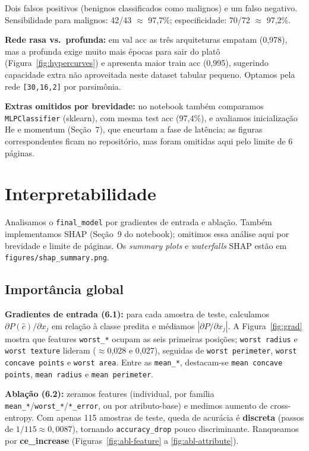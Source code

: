 \documentclass[a4paper,11pt]{article}
\begin{document}
Dois falsos positivos (benignos classificados como malignos) e um falso negativo. Sensibilidade para malignos: 42/43 $\approx$ 97,7\%; especificidade: 70/72 $\approx$ 97,2\%.

\textbf{Rede rasa vs.\ profunda:} em val acc as três arquiteturas empatam (0{,}978), mas a profunda exige muito mais épocas para sair do platô (Figura~\ref{fig:hypercurves}) e apresenta maior train acc (0{,}995), sugerindo capacidade extra não aproveitada neste dataset tabular pequeno. Optamos pela rede \texttt{[30,16,2]} por parsimônia.

\textbf{Extras omitidos por brevidade:} no notebook também comparamos \texttt{MLPClassifier} (sklearn), com mesma test acc (97,4\%), e avaliamos inicialização He e momentum (Seção~7), que encurtam a fase de latência; as figuras correspondentes ficam no repositório, mas foram omitidas aqui pelo limite de 6 páginas.

\section{Interpretabilidade}

Analisamos o \texttt{final\_model} por gradientes de entrada e ablação. Também implementamos SHAP (Seção~9 do notebook); omitimos essa análise aqui por brevidade e limite de páginas. Os \emph{summary plots} e \emph{waterfalls} SHAP estão em \texttt{figures/shap\_summary.png}.

\subsection{Importância global}

\textbf{Gradientes de entrada (6.1):} para cada amostra de teste, calculamos $\partial P(\hat{c})/\partial x_j$ em relação à classe predita e médiamos $|\partial P / \partial x_j|$. A Figura~\ref{fig:grad} mostra que features \texttt{worst\_*} ocupam as seis primeiras posições; \texttt{worst radius} e \texttt{worst texture} lideram ($\approx$0{,}028 e 0{,}027), seguidas de \texttt{worst perimeter}, \texttt{worst concave points} e \texttt{worst area}. Entre as \texttt{mean\_*}, destacam-se \texttt{mean concave points}, \texttt{mean radius} e \texttt{mean perimeter}.

\textbf{Ablação (6.2):} zeramos features (individual, por família \texttt{mean\_*}/\texttt{worst\_*}/\texttt{*\_error}, ou por atributo-base) e medimos aumento de cross-entropy. Com apenas 115 amostras de teste, queda de acurácia é \textbf{discreta} (passos de $1/115 \approx 0{,}0087$), tornando \texttt{accuracy\_drop} pouco discriminante. Ranqueamos por \textbf{ce\_increase} (Figuras~\ref{fig:abl-feature} a \ref{fig:abl-attribute}).
\end{document}
